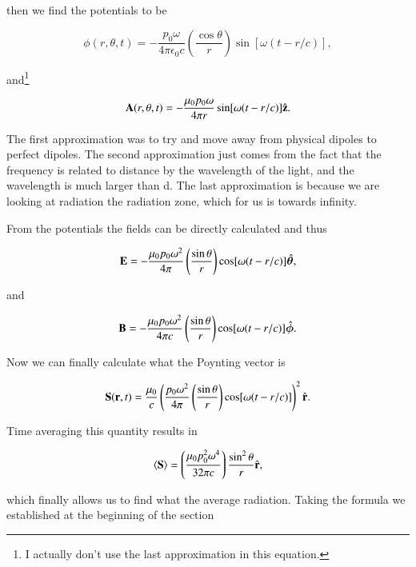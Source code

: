 \documentclass[preprint, review,12pt]{elsarticle}
\def\b{\textbf}
\def\9{\left(}
\def\0{\right)}
\newcommand{\hb}[1]{\hat{\b #1}}
\newcommand{\hbm}[1]{\hat{\bm #1}}
\newcommand{\brak}[1]{\langle #1 \rangle}
\begin{document}
then we find the potentials to be

\begin{equation}
    \phi(r, \theta, t) = -\frac{p_0 \omega}{4 \pi \epsilon_0 c} \9 \frac{\cos \theta}{r} \0 \sin[\omega(t-r/c)],
\end{equation}

and\footnote{I actually don't use the last approximation in this equation.}

\begin{equation}
    \b A(r, \theta, t) = -\frac{\mu_0 p_0 \omega}{4 \pi r} \sin[\omega(t-r/c)] \hb{z}.
\end{equation}

The first approximation was to try and move away from physical dipoles to perfect dipoles. The second approximation just comes from the fact that the frequency is related to distance by the wavelength of the light, and the wavelength is much larger than d. The last approximation is because we are looking at radiation the radiation zone, which for us is towards infinity.

From the potentials the fields can be directly calculated and thus

\begin{equation}
    \b E = - \frac{\mu_0 p_0 \omega^2}{4 \pi} \9 \frac{\sin\theta}{r} \0 \cos[\omega(t-r/c)] \hbm{\theta},
\end{equation}

and

\begin{equation}
    \b B = - \frac{\mu_0 p_0 \omega^2}{4 \pi c} \9 \frac{\sin\theta}{r} \0 \cos[\omega(t-r/c)] \hbm{\phi}.
\end{equation}

Now we can finally calculate what the Poynting vector is

\begin{equation}
    \b S(\b r, t) = \frac{\mu_0}{c} \9 \frac{p_0 \omega^2}{4 \pi} \9 \frac{\sin\theta}{r} \0 \cos[\omega(t-r/c)] \0^2 \hb{r}.
\end{equation}

Time averaging this quantity results in

\begin{equation}
    \brak{\b S} = \9 \frac{\mu_0 p_0^2 \omega^4}{32\pi c} \0 \frac{\sin^2 \theta}{r}\hb{r},
\end{equation}

which finally allows us to find what the average radiation. Taking the formula we established at the beginning of the section
\end{document}

